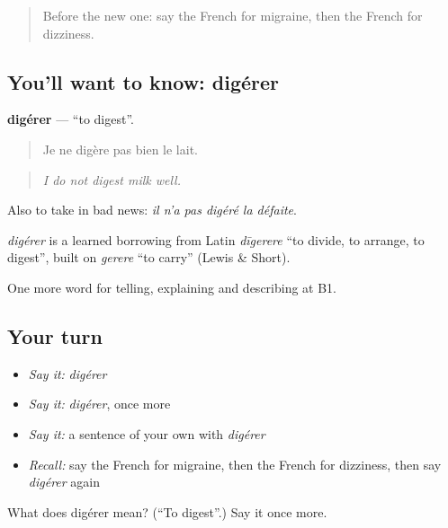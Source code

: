 \label{lesson:FR-C483-digerer}



\begin{quote}
Before the new one: say the French for migraine, then the French for dizziness.
\end{quote}

\subsection*{You'll want to know: digérer}
\textbf{digérer} — \textquotedblleft{}to digest\textquotedblright{}.

\begin{quote}
Je ne digère pas bien le lait.
\end{quote}

\begin{quote}
\emph{I do not digest milk well.}
\end{quote}

Also to take in bad news: \emph{il n'a pas digéré la défaite}.

\begin{cousinweb}
\emph{digérer} is a learned borrowing from Latin \emph{dīgerere} \textquotedblleft{}to divide, to arrange, to digest\textquotedblright{}, built on \emph{gerere} \textquotedblleft{}to carry\textquotedblright{} (Lewis \& Short).
\end{cousinweb}

\begin{grammarlens}[title={What you've built}]
One more word for telling, explaining and describing at B1.
\end{grammarlens}

\subsection*{Your turn}
\begin{itemize}
\raggedright
  \item \emph{Say it:} \emph{digérer}
  \item \emph{Say it:} \emph{digérer}, once more
  \item \emph{Say it:} a sentence of your own with \emph{digérer}
  \item \emph{Recall:} say the French for migraine, then the French for dizziness, then say \emph{digérer} again
\end{itemize}

\begin{tcolorbox}[breakable,colback=teal!4,colframe=teal!35!black,title={Before you move on}]
What does digérer mean? (\textquotedblleft{}To digest\textquotedblright{}.) Say it once more.
\end{tcolorbox}
